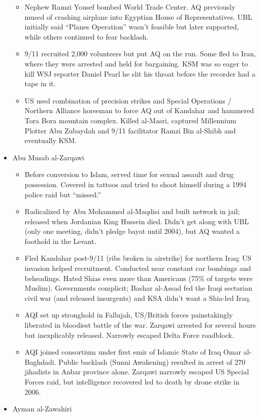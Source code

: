 \documentclass[
]{article}
\begin{document}
\begin{itemize}
  \begin{itemize}
  \item
    Nephew Ramzi Yousef bombed World Trade Center. AQ previously mused
    of crashing airplane into Egyptian House of Representatives. UBL
    initially said ``Planes Operation'' wasn't feasible but later
    supported, while others continued to fear backlash.
  \item
    9/11 recruited 2,000 volunteers but put AQ on the run. Some fled to
    Iran, where they were arrested and held for bargaining. KSM was so
    eager to kill WSJ reporter Daniel Pearl he slit his throat before
    the recorder had a tape in it.
  \item
    US used combination of precision strikes and Special Operations /
    Northern Alliance horseman to force AQ out of Kandahar and hammered
    Tora Bora mountain complex. Killed al-Masri, captured Millennium
    Plotter Abu Zubaydah and 9/11 facilitator Ramzi Bin al-Shibh and
    eventually KSM.
  \end{itemize}
\item
  Abu Musab al-Zarqawi

  \begin{itemize}
  \item
    Before conversion to Islam, served time for sexual assault and drug
    possession. Covered in tattoos and tried to shoot himself during a
    1994 police raid but ``missed.''
  \item
    Radicalized by Abu Mohammed al-Maqdisi and built network in jail;
    released when Jordanian King Hussein died. Didn't get along with UBL
    (only one meeting, didn't pledge bayat until 2004), but AQ wanted a
    foothold in the Levant.
  \item
    Fled Kandahar post-9/11 (ribs broken in airstrike) for northern
    Iraq; US invasion helped recruitment. Conducted near constant car
    bombings and beheadings. Hated Shias even more than Americans (75\%
    of targets were Muslim). Governments complicit; Bashar al-Assad fed
    the Iraqi sectarian civil war (and released insurgents) and KSA
    didn't want a Shia-led Iraq.
  \item
    AQI set up stronghold in Fallujah, US/British forces painstakingly
    liberated in bloodiest battle of the war. Zarqawi arrested for
    several hours but inexplicably released. Narrowly escaped Delta
    Force roadblock.
  \item
    AQI joined consortium under first emir of Islamic State of Iraq Omar
    al-Baghdadi. Public backlash (Sunni Awakening) resulted in arrest of
    270 jihadists in Anbar province alone. Zarqawi narrowly escaped US
    Special Forces raid, but intelligence recovered led to death by
    drone strike in 2006.
  \end{itemize}
\item
  Ayman al-Zawahiri


\end{itemize}
\end{document}
